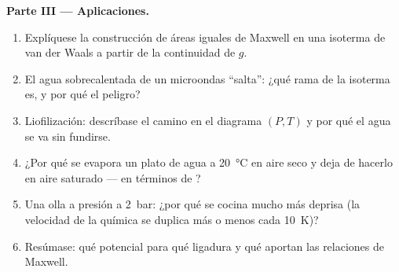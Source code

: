 \begin{problem}
\textbf{Parte III --- Aplicaciones.}
\begin{enumerate}[resume]
  \item Explíquese la construcción de áreas iguales de Maxwell en una isoterma de
        van der Waals a partir de la continuidad de $g$.
  \item El agua sobrecalentada de un microondas ``salta'': ¿qué rama de la
        isoterma es, y por qué el peligro?
  \item Liofilización: descríbase el camino en el diagrama $(P,T)$ y
        por qué el agua se va sin fundirse.
  \item ¿Por qué se evapora un plato de agua a \qty{20}{\celsius} en aire seco
        y deja de hacerlo en aire saturado --- en términos de ?
  \item Una olla a presión a \qty{2}{bar}: ¿por qué se cocina mucho
        más deprisa (la velocidad de la química se duplica más o menos cada
        \qty{10}{K})?
  \item Resúmase: qué potencial para qué ligadura y qué aportan las
        relaciones de Maxwell.
\end{enumerate}
\end{problem}
